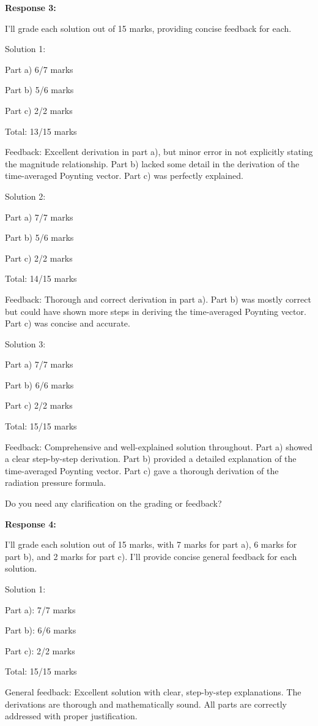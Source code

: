 \documentclass[a4paper,11pt]{article}
\begin{document}
\bigskip
\textbf{Response 3:}

I'll grade each solution out of 15 marks, providing concise feedback for each.

Solution 1:

Part a) 6/7 marks

Part b) 5/6 marks

Part c) 2/2 marks

Total: 13/15 marks

Feedback: Excellent derivation in part a), but minor error in not explicitly stating the magnitude relationship. Part b) lacked some detail in the derivation of the time-averaged Poynting vector. Part c) was perfectly explained.

Solution 2:

Part a) 7/7 marks

Part b) 5/6 marks

Part c) 2/2 marks

Total: 14/15 marks

Feedback: Thorough and correct derivation in part a). Part b) was mostly correct but could have shown more steps in deriving the time-averaged Poynting vector. Part c) was concise and accurate.

Solution 3:

Part a) 7/7 marks

Part b) 6/6 marks

Part c) 2/2 marks

Total: 15/15 marks

Feedback: Comprehensive and well-explained solution throughout. Part a) showed a clear step-by-step derivation. Part b) provided a detailed explanation of the time-averaged Poynting vector. Part c) gave a thorough derivation of the radiation pressure formula.

Do you need any clarification on the grading or feedback?

\bigskip
\textbf{Response 4:}

I'll grade each solution out of 15 marks, with 7 marks for part a), 6 marks for part b), and 2 marks for part c). I'll provide concise general feedback for each solution.

Solution 1:

Part a): 7/7 marks

Part b): 6/6 marks

Part c): 2/2 marks

Total: 15/15 marks

General feedback: Excellent solution with clear, step-by-step explanations. The derivations are thorough and mathematically sound. All parts are correctly addressed with proper justification.
\end{document}
